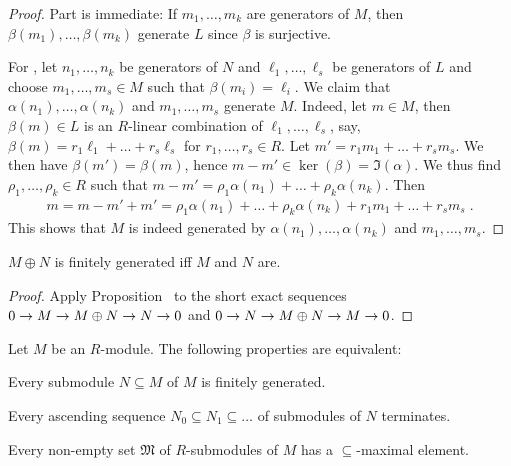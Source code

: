 \documentclass[a4paper,parskip=half,numbers=enddot, DIV=12]{scrreprt}
\begin{document}
	\begin{proof}
		Part  is immediate: If $m_1,\ldots,m_k$ are generators of $M$, then $\beta(m_1),\ldots,\beta(m_k)$ generate $L$ since $\beta$ is surjective.
		
		For , let $n_1,\ldots,n_k$ be generators of $N$ and $\ell_1,\ldots,\ell_s$ be generators of $L$ and choose $m_1,\ldots,m_s\in M$ such that $\beta(m_i)=\ell_i$. We claim that $\alpha(n_1),\ldots,\alpha(n_k)$ and $m_1,\ldots,m_s$ generate $M$. Indeed, let $m\in M$, then $\beta(m)\in L$ is an $R$-linear combination of $\ell_1,\ldots,\ell_s$, say, $\beta(m)=r_1\ell_1+\ldots+r_s\ell_s$ for $r_1,\ldots,r_s\in R$. Let $m'=r_1m_1+\ldots+r_sm_s$. We then have $\beta(m')=\beta(m)$, hence $m-m'\in\ker(\beta)=\Im(\alpha)$. We thus find $\rho_1,\ldots,\rho_k\in R$ such that $m-m'=\rho_1\alpha(n_1)+\ldots+\rho_k\alpha(n_k)$. Then
		\begin{align*}
			m=m-m'+m'=\rho_1\alpha(n_1)+\ldots+\rho_k\alpha(n_k)+r_1m_1+\ldots+r_sm_s\;.
		\end{align*}
		This shows that $M$ is indeed generated by $\alpha(n_1),\ldots,\alpha(n_k)$ and $m_1,\ldots,m_s$.
	\end{proof}	
	\begin{cor}
		$M\oplus N$ is finitely generated iff $M$ and $N$ are. 
	\end{cor}
	\begin{proof}
		Apply Proposition~ to the short exact sequences $0\morphism M\morphism M\oplus N\morphism N\morphism 0$ and $0\morphism N\morphism M\oplus N\morphism M\morphism 0$.
	\end{proof}
	\begin{prop}
		Let $M$ be an $R$-module. The following properties are equivalent:
		\begin{alphanumerate}
			\item Every submodule $N\subseteq M$ of $M$ is finitely generated.
			\item Every ascending sequence $N_0\subseteq N_1\subseteq \ldots$ of submodules of $N$ terminates.
			\item Every non-empty set $\mathfrak{M}$ of $R$-submodules of $M$ has a $\subseteq$-maximal element.
		\end{alphanumerate}
	\end{prop}
\end{document}
